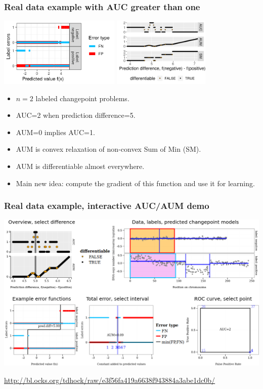\documentclass{beamer}
\begin{document}
\begin{frame}
  \frametitle{Real data example with AUC greater than one}

  \includegraphics[height=1.3in]{figure-aum-convexity-profiles}
  \includegraphics[height=1.3in]{figure-aum-convexity}

  \begin{itemize}
  \item $n=2$ labeled changepoint problems.
  \item AUC=2 when prediction difference=5.
  \item AUM=0 implies AUC=1.
  \item AUM is convex relaxation of non-convex Sum of Min (SM).
  \item AUM is differentiable almost everywhere.
  \item Main new idea: compute the gradient of this function and use
    it for learning.
  \end{itemize}

\end{frame}

\begin{frame}
  \frametitle{Real data example, interactive AUC/AUM demo}

  \includegraphics[width=\textwidth]{figure-aum-convexity-interactive}

  \url{http://bl.ocks.org/tdhock/raw/e3f56fa419a6638f943884a3abe1dc0b/} 

\end{frame}
\end{document}
